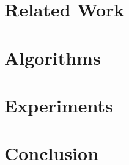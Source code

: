 \documentclass[]{sigcomm-alternate}
\begin{document}
\section{Related Work}\label{sec:related}

\section{Algorithms}\label{sec:algo}

\section{Experiments}\label{sec:exp}

\section{Conclusion}\label{sec:conclusion}







%
\scriptsize
\vspace{-0.1in}

\vspace{1em}
%
%


\balancecolumns
\end{document}
